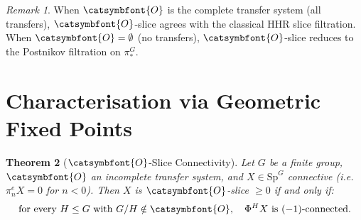 \documentclass[12pt]{article}
\newtheorem{theorem}{Theorem}
\theoremstyle{definition}
\theoremstyle{remark}
\newtheorem{remark}[theorem]{Remark}
\newcommand{\aO}{{\catsymbfont{O}}}
\begin{document}
\begin{remark}
When $\aO$ is the complete transfer system (all transfers), $\aO$-slice
agrees with the classical HHR slice filtration.  When $\aO = \emptyset$
(no transfers), $\aO$-slice reduces to the Postnikov filtration on $\pi_*^G$.
\end{remark}

\section{Characterisation via Geometric Fixed Points}

\begin{theorem}[$\aO$-Slice Connectivity]\label{thm:main}
Let $G$ be a finite group, $\aO$ an incomplete transfer system, and $X\in
\mathrm{Sp}^G$ connective (i.e.\ $\pi_n^e X = 0$ for $n < 0$).  Then $X$
is $\aO$-slice $\geq 0$ if and only if:
\begin{equation}\label{eq:cond}
  \text{for every $H\leq G$ with } G/H \notin \aO,\quad
  \Phi^H X \text{ is } (-1)\text{-connected}.
\end{equation}
\end{theorem}
\end{document}
